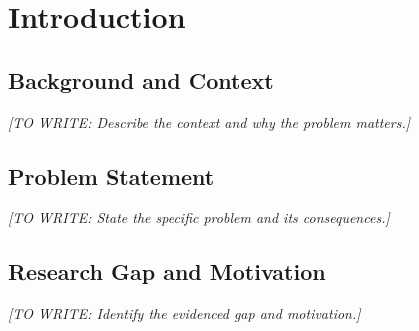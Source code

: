 \documentclass[12pt,a4paper,oneside]{report}
\newif\ifshowguidance
\newif\ifincludeglossary
\newcommand{\Guide}[1]{%
  \ifshowguidance
  \begin{tcolorbox}[enhanced,breakable,colback=GuideBlue,
    colframe=GuideBorder,boxrule=0.5pt,arc=1mm,
    title={Writing guide --- replace with your research},
    colbacktitle=ThesisBlue,coltitle=white,fonttitle=\small\bfseries,
    before skip=10pt,after skip=10pt]
    \small #1
  \end{tcolorbox}
  \fi}
\newcommand{\Draft}[1]{\par\noindent\textit{[TO WRITE: #1]}\par}
\newcommand{\FrontChapter}[1]{%
  \chapter*{#1}\phantomsection\addcontentsline{toc}{chapter}{#1}%
  \markboth{#1}{#1}}
\begin{document}
\ifincludeglossary
\FrontChapter{Glossary}
\Guide{Optional. Define specialized terms used repeatedly or differently
across disciplines. Avoid duplicating the abbreviation and symbol lists.}
\Draft{Add concise definitions and supporting sources where needed.}
\fi

\clearpage
{}

\chapter{Introduction}
\label{ch:introduction}
\Guide{Lead the reader from the research context to a precise problem, then
to the questions, approach, contribution, and scope. An introduction explains
why the study is needed; the literature review provides the detailed evidence.
End with a clear account of what this thesis will demonstrate.}

\section{Background and Context}
\Guide{Introduce the field, application, system, or phenomenon. Explain the
technical or scientific importance with verified evidence. Define essential
terms for a reader in your discipline who is unfamiliar with the exact topic.
Move from broad context to the particular setting; avoid an unrelated history.}
\Draft{Describe the context and why the problem matters.}

\section{Problem Statement}
\Guide{State what is currently unknown, inaccurate, inefficient, or poorly
understood. Identify the affected system or population and the consequences.
Separate the practical problem from the researchable knowledge gap. Make the
statement precise enough that the reader can judge whether you resolved it.}
\Draft{State the specific problem and its consequences.}

\section{Research Gap and Motivation}
\Guide{Summarize what existing approaches accomplish and what they leave
unresolved. Support the gap with sources analyzed in Chapter~2. Explain why
the limitation matters and how your study addresses it. Do not claim that
``no studies exist'' without a sufficiently documented search.}
\Draft{Identify the evidenced gap and motivation.}
\end{document}
